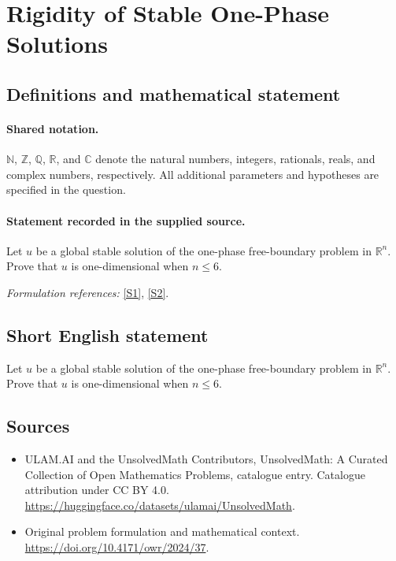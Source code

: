 \documentclass[11pt]{article}
\newcommand{\sref}[2]{\hyperlink{source:#1:#2}{[S#2]}}
\begin{document}
\section{Rigidity of Stable One-Phase Solutions}\label{statement}

\subsection{Definitions and mathematical statement}

\paragraph{Shared notation.}$\mathbb N$, $\mathbb Z$, $\mathbb Q$, $\mathbb R$, and $\mathbb C$ denote the natural numbers, integers, rationals, reals, and complex numbers, respectively. All additional parameters and hypotheses are specified in the question.


\paragraph{Statement recorded in the supplied source.}
Let $u$ be a global stable solution of the one-phase free-boundary problem in $\mathbb R^n$. Prove that $u$ is one-dimensional when $n\leq 6$.
\par\smallskip\textit{Formulation references:} \sref{statement}{1}, \sref{statement}{2}.
\subsection{Short English statement}
Let $u$ be a global stable solution of the one-phase free-boundary problem in $\mathbb R^n$. Prove that $u$ is one-dimensional when $n\leq 6$.
\subsection{Sources}
\begin{itemize}
\item[\hypertarget{source:statement:1}{S1}] ULAM.AI and the UnsolvedMath Contributors, UnsolvedMath: A Curated Collection of Open Mathematics Problems, catalogue entry. Catalogue attribution under CC BY 4.0.
\url{https://huggingface.co/datasets/ulamai/UnsolvedMath}.
\item[\hypertarget{source:statement:2}{S2}] Original problem formulation and mathematical context.
\url{https://doi.org/10.4171/owr/2024/37}.
\end{itemize}
\label{end:statement}
\end{document}
